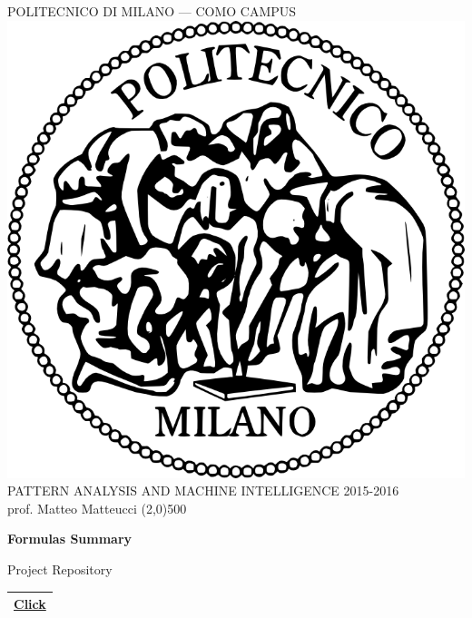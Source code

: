 \documentclass[a4paper,12pt,titlepage]{article} %
\begin{document}
	\begin{titlepage}
		
		\begin{center}
			POLITECNICO DI MILANO --- COMO CAMPUS\\
			\vspace{10pt}
			\includegraphics[scale=0.1]{logo-polimi.png}\\
			\vspace{10pt}
			PATTERN ANALYSIS AND MACHINE INTELLIGENCE 2015-2016\\
			prof. Matteo Matteucci	
			\line(2,0){500}
		\end{center}
		
		\vspace{60pt}	
		\begin{center}
			{\Huge \textbf{Formulas Summary}}\\
		\end{center}
		
		\vspace{60pt}
		
		\begin{center}
			{\large Project Repository}
		\end{center}
		\begin{tabularx}{\textwidth}{|X|}
			\hline
			\href{https://github.com/attillax/PAMI-2015}{Click}\\
			\hline
		\end{tabularx}
		

\end{titlepage}
\end{document}
